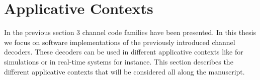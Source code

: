 


\section{Applicative Contexts}

In the previous section 3 channel code families have been presented. In this
thesis we focus on software implementations of the previously introduced channel
decoders. These decoders can be used in different applicative contexts like for
simulations or in real-time systems for instance. This section describes the
different applicative contexts that will be considered all along the manuscript.

